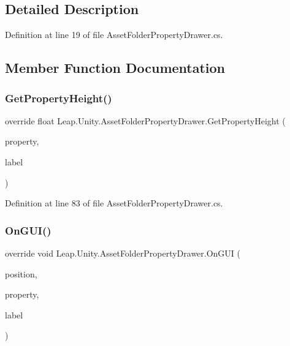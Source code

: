 \subsection{Detailed Description}


Definition at line 19 of file Asset\+Folder\+Property\+Drawer.\+cs.



\subsection{Member Function Documentation}
\mbox{\label{class_leap_1_1_unity_1_1_asset_folder_property_drawer_a3b57e2738c7c482308b07f3ebfbce706}} 
\subsubsection{\texorpdfstring{GetPropertyHeight()}{GetPropertyHeight()}}
{\footnotesize\ttfamily override float Leap.\+Unity.\+Asset\+Folder\+Property\+Drawer.\+Get\+Property\+Height (\begin{DoxyParamCaption}\item[{Serialized\+Property}]{property,  }\item[{G\+U\+I\+Content}]{label }\end{DoxyParamCaption})}



Definition at line 83 of file Asset\+Folder\+Property\+Drawer.\+cs.

\mbox{\label{class_leap_1_1_unity_1_1_asset_folder_property_drawer_af800a23a840208fb890ab61022942301}} 
\subsubsection{\texorpdfstring{OnGUI()}{OnGUI()}}
{\footnotesize\ttfamily override void Leap.\+Unity.\+Asset\+Folder\+Property\+Drawer.\+On\+G\+UI (\begin{DoxyParamCaption}\item[{Rect}]{position,  }\item[{Serialized\+Property}]{property,  }\item[{G\+U\+I\+Content}]{label }\end{DoxyParamCaption})}



